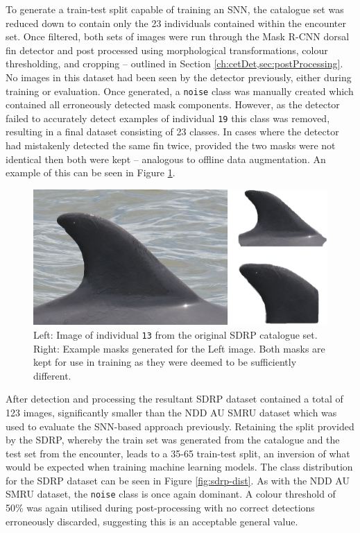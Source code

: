 To generate a train-test split capable of training an SNN, the catalogue set was reduced down to contain only the 23 individuals contained within the encounter set. Once filtered, both sets of images were run through the Mask R-CNN dorsal fin detector and post processed using morphological transformations, colour thresholding, and cropping -- outlined in Section \ref{ch:cetDet,sec:postProcessing}. No images in this dataset had been seen by the detector previously, either during training or evaluation. Once generated, a \texttt{noise} class was manually created which contained all erroneously detected mask components. However, as the detector failed to accurately detect examples of individual \texttt{19} this class was removed, resulting in a final dataset consisting of 23 classes. In cases where the detector had mistakenly detected the same fin twice, provided the two masks were not identical then both were kept -- analogous to offline data augmentation. An example of this can be seen in Figure \ref{fig:sdrp-double-mask-eg}.

\begin{figure}
	\begin{center}
		\includegraphics[scale=0.5]{Chapter6/figs/SDRP-double-mask-eg-indv-13.png}
	\end{center}
	\caption[Left: Image of individual \texttt{13} from the original SDRP catalogue set. Right: Example masks generated for the Left image.]{Left: Image of individual \texttt{13} from the original SDRP catalogue set. Right: Example masks generated for the Left image. Both masks are kept for use in training as they were deemed to be sufficiently different.}
	\label{fig:sdrp-double-mask-eg}
\end{figure}

After detection and processing the resultant SDRP dataset contained a total of 123 images, significantly smaller than the NDD AU SMRU dataset which was used to evaluate the SNN-based approach previously. Retaining the split provided by the SDRP, whereby the train set was generated from the catalogue and the test set from the encounter, leads to a 35-65 train-test split, an inversion of what would be expected when training machine learning models. The class distribution for the SDRP dataset can be seen in Figure \ref{fig:sdrp-dist}. As with the NDD AU SMRU dataset, the \texttt{noise} class is once again dominant. A colour threshold of 50\% was again utilised during post-processing with no correct detections erroneously discarded, suggesting this is an acceptable general value.

